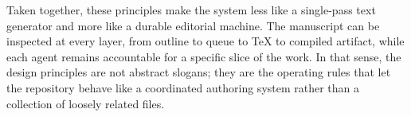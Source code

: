 Taken together, these principles make the system less like a single-pass text generator and more like a durable editorial machine. The manuscript can be inspected at every layer, from outline to queue to \TeX{} to compiled artifact, while each agent remains accountable for a specific slice of the work. In that sense, the design principles are not abstract slogans; they are the operating rules that let the repository behave like a coordinated authoring system rather than a collection of loosely related files.
